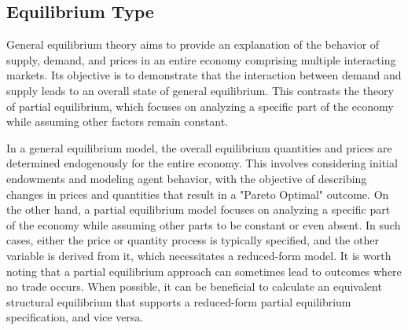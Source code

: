 \documentclass[11pt]{article}
\begin{document}
\begin{center}
\end{center}

\subsection{Equilibrium Type}
General equilibrium theory aims to provide an explanation of the behavior of supply, demand, and prices in an entire economy comprising multiple interacting markets. Its objective is to demonstrate that the interaction between demand and supply leads to an overall state of general equilibrium. This contrasts the theory of partial equilibrium, which focuses on analyzing a specific part of the economy while assuming other factors remain constant.

In a general equilibrium model, the overall equilibrium quantities and prices are determined endogenously for the entire economy. This involves considering initial endowments and modeling agent behavior, with the objective of describing changes in prices and quantities that result in a "Pareto Optimal" outcome. On the other hand, a partial equilibrium model focuses on analyzing a specific part of the economy while assuming other parts to be constant or even absent. In such cases, either the price or quantity process is typically specified, and the other variable is derived from it, which necessitates a reduced-form model. It is worth noting that a partial equilibrium approach can sometimes lead to outcomes where no trade occurs. When possible, it can be beneficial to calculate an equivalent structural equilibrium that supports a reduced-form partial equilibrium specification, and vice versa. 
\end{document}
